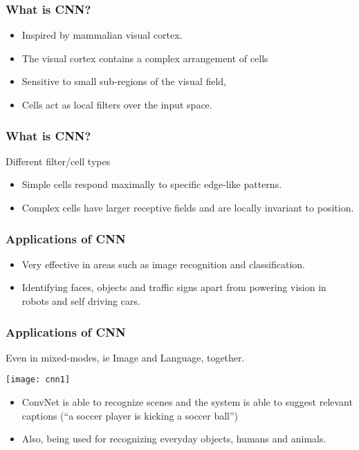 \begin{frame}[fragile] \frametitle{What is CNN?}

\begin{itemize}
\item Inspired by mammalian visual cortex.
\item The visual cortex contains a complex arrangement of cells
\item Sensitive to small sub-regions of the visual field, 
\item Cells act as local filters over the input space.
\end{itemize}
\end{frame}

\begin{frame}[fragile] \frametitle{What is CNN?}

Different filter/cell types
\begin{itemize}
\item Simple cells respond maximally to specific edge-like patterns.
\item Complex cells have larger receptive fields and are locally invariant to position.

\end{itemize}
\end{frame}

\begin{frame}[fragile] \frametitle{Applications of CNN}

\begin{itemize}
\item Very effective in areas such as image recognition and classification.
\item Identifying faces, objects and traffic signs apart from powering vision in robots and self driving cars.
\end{itemize}
\end{frame}



\begin{frame}[fragile] \frametitle{Applications of CNN}

Even in mixed-modes, ie Image and Language, together.


\begin{center}
\texttt{[image: cnn1]}
\end{center}

 \begin{itemize}
\item  ConvNet is able to recognize scenes and the system is able to suggest relevant captions (``a soccer player is kicking a soccer ball'')
\item Also, being used for recognizing everyday objects, humans and animals.
\end{itemize}
\end{frame}


